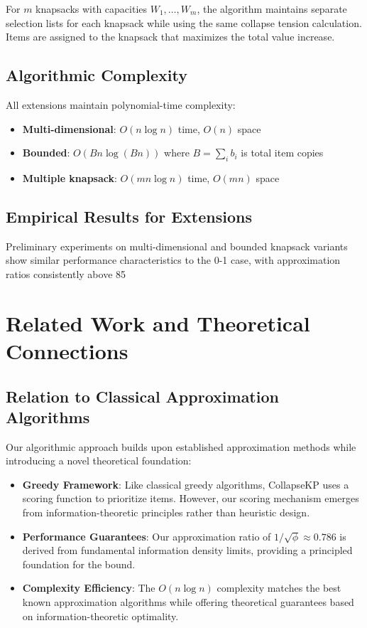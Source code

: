 \documentclass[11pt]{article}
\theoremstyle{remark}
\theoremstyle{definition}
\begin{document}
For $m$ knapsacks with capacities $W_1, \ldots, W_m$, the algorithm maintains separate selection lists for each knapsack while using the same collapse tension calculation. Items are assigned to the knapsack that maximizes the total value increase.

\subsection{Algorithmic Complexity}

All extensions maintain polynomial-time complexity:
\begin{itemize}
\item \textbf{Multi-dimensional}: $O(n \log n)$ time, $O(n)$ space
\item \textbf{Bounded}: $O(B n \log(B n))$ where $B = \sum_i b_i$ is total item copies
\item \textbf{Multiple knapsack}: $O(m n \log n)$ time, $O(m n)$ space
\end{itemize}

\subsection{Empirical Results for Extensions}

Preliminary experiments on multi-dimensional and bounded knapsack variants show similar performance characteristics to the 0-1 case, with approximation ratios consistently above 85%

\section{Related Work and Theoretical Connections}

\subsection{Relation to Classical Approximation Algorithms}

Our algorithmic approach builds upon established approximation methods \cite{vazirani2001approximation,williamson2011design} while introducing a novel theoretical foundation:

\begin{itemize}
\item \textbf{Greedy Framework}: Like classical greedy algorithms, CollapseKP uses a scoring function to prioritize items. However, our scoring mechanism emerges from information-theoretic principles rather than heuristic design.
\item \textbf{Performance Guarantees}: Our approximation ratio of $1/\sqrt{\phi} \approx 0.786$ is derived from fundamental information density limits, providing a principled foundation for the bound.
\item \textbf{Complexity Efficiency}: The $O(n \log n)$ complexity matches the best known approximation algorithms while offering theoretical guarantees based on information-theoretic optimality.
\end{itemize}
\end{document}
